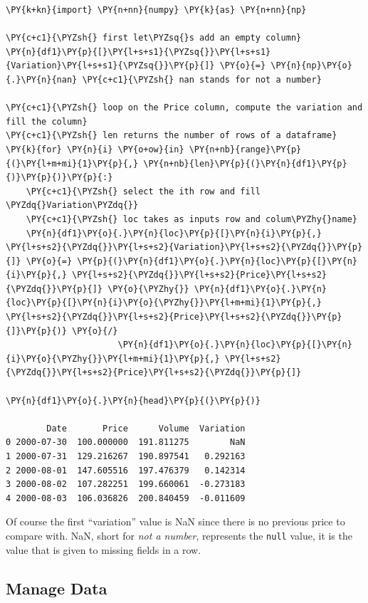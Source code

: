 \begin{tcolorbox}[breakable, size=fbox, boxrule=1pt, pad at break*=1mm,colback=cellbackground, colframe=cellborder]
\begin{Verbatim}[commandchars=\\\{\}]
\PY{k+kn}{import} \PY{n+nn}{numpy} \PY{k}{as} \PY{n+nn}{np}

\PY{c+c1}{\PYZsh{} first let\PYZsq{}s add an empty column}
\PY{n}{df1}\PY{p}{[}\PY{l+s+s1}{\PYZsq{}}\PY{l+s+s1}{Variation}\PY{l+s+s1}{\PYZsq{}}\PY{p}{]} \PY{o}{=} \PY{n}{np}\PY{o}{.}\PY{n}{nan} \PY{c+c1}{\PYZsh{} nan stands for not a number}

\PY{c+c1}{\PYZsh{} loop on the Price column, compute the variation and fill the column}
\PY{c+c1}{\PYZsh{} len returns the number of rows of a dataframe}
\PY{k}{for} \PY{n}{i} \PY{o+ow}{in} \PY{n+nb}{range}\PY{p}{(}\PY{l+m+mi}{1}\PY{p}{,} \PY{n+nb}{len}\PY{p}{(}\PY{n}{df1}\PY{p}{)}\PY{p}{)}\PY{p}{:}
    \PY{c+c1}{\PYZsh{} select the ith row and fill \PYZdq{}Variation\PYZdq{}}
    \PY{c+c1}{\PYZsh{} loc takes as inputs row and colum\PYZhy{}name}
    \PY{n}{df1}\PY{o}{.}\PY{n}{loc}\PY{p}{[}\PY{n}{i}\PY{p}{,} \PY{l+s+s2}{\PYZdq{}}\PY{l+s+s2}{Variation}\PY{l+s+s2}{\PYZdq{}}\PY{p}{]} \PY{o}{=} \PY{p}{(}\PY{n}{df1}\PY{o}{.}\PY{n}{loc}\PY{p}{[}\PY{n}{i}\PY{p}{,} \PY{l+s+s2}{\PYZdq{}}\PY{l+s+s2}{Price}\PY{l+s+s2}{\PYZdq{}}\PY{p}{]} \PY{o}{\PYZhy{}} \PY{n}{df1}\PY{o}{.}\PY{n}{loc}\PY{p}{[}\PY{n}{i}\PY{o}{\PYZhy{}}\PY{l+m+mi}{1}\PY{p}{,} \PY{l+s+s2}{\PYZdq{}}\PY{l+s+s2}{Price}\PY{l+s+s2}{\PYZdq{}}\PY{p}{]}\PY{p}{)} \PY{o}{/}
                      \PY{n}{df1}\PY{o}{.}\PY{n}{loc}\PY{p}{[}\PY{n}{i}\PY{o}{\PYZhy{}}\PY{l+m+mi}{1}\PY{p}{,} \PY{l+s+s2}{\PYZdq{}}\PY{l+s+s2}{Price}\PY{l+s+s2}{\PYZdq{}}\PY{p}{]}

\PY{n}{df1}\PY{o}{.}\PY{n}{head}\PY{p}{(}\PY{p}{)}

        Date       Price      Volume  Variation
0 2000-07-30  100.000000  191.811275        NaN
1 2000-07-31  129.216267  190.897541   0.292163
2 2000-08-01  147.605516  197.476379   0.142314
3 2000-08-02  107.282251  199.660061  -0.273183
4 2000-08-03  106.036826  200.840459  -0.011609
\end{Verbatim}
\end{tcolorbox}
\noindent
Of course the first ``variation'' value is NaN since there is no previous price to compare with.
NaN, short for \emph{not a number}, represents the \texttt{null} value, it is the value that is 
given to missing fields in a row. 

\subsection{Manage Data}\label{manage-data}


